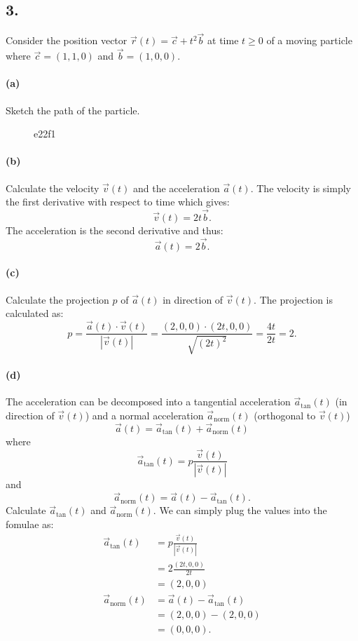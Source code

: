 \subsection*{3.} Consider the position vector $\Vec{r}(t) = \Vec{c} + t^2 \Vec{b}$ at time $t \geq 0$ of a moving particle where $\Vec{c} = \left( 1,1,0 \right) $ and $\Vec{b} = \left( 1,0,0 \right) $.

\paragraph{(a)} Sketch the path of the particle.
\bigbreak
\begin{figure}[ht]
    \centering
    \caption{e22f1}
    \label{fig:e22f1}
\end{figure}

\paragraph{(b)} Calculate the velocity $\Vec{v}(t)$ and the acceleration $\Vec{a} (t)$.
\bigbreak
The velocity is simply the first derivative with respect to time which gives:
\[ 
\Vec{v}(t) = 2t \Vec{b}
.\]
The acceleration is the second derivative and thus:
\[ 
\Vec{a}(t) = 2\Vec{b}
.\]


\paragraph{(c)} Calculate the projection $p$ of $\Vec{a}(t)$ in direction of $\Vec{v}(t)$.
\bigbreak
The projection is calculated as:
\[ 
p = \frac{\Vec{a}(t) \cdot \Vec{v}(t)}{\left| \Vec{v}(t) \right|} = \frac{\left( 2,0,0 \right) \cdot \left( 2t, 0, 0 \right) }{\sqrt{\left( 2t \right) ^2}} = \frac{4t}{2t} = 2
.\]


\paragraph{(d)} The acceleration can be decomposed into a tangential acceleration $\Vec{a}_{\mathrm{tan}}(t)$ (in direction of $\Vec{v}(t)$) and a normal acceleration $\Vec{a}_{\mathrm{norm}}(t) $ (orthogonal to $\Vec{v}(t)$)
\[ 
\Vec{a}(t) = \Vec{a}_{\mathrm{tan}} (t) + \Vec{a}_{\mathrm{norm}}(t)
\]
where
\[ 
\Vec{a}_{\mathrm{tan}} (t) = p \frac{\Vec{v}(t)}{\left| \Vec{v}(t) \right|}
\]
and
\[ 
\Vec{a}_{\mathrm{norm}}(t) = \Vec{a}(t) - \Vec{a}_{\mathrm{tan}}(t)
.\]
Calculate $\Vec{a}_{\mathrm{tan}}(t)$ and $\Vec{a}_{\mathrm{norm}}(t)$.
\bigbreak
We can simply plug the values into the fomulae as:
\begin{align*}
  \Vec{a}_{\mathrm{tan}} (t) &= p \frac{\Vec{v}(t)}{\left| \Vec{v}(t) \right|} \\
  &= 2 \frac{\left( 2t,0,0 \right) }{2t} \\
  &= \left( 2,0,0 \right)  \\
  \Vec{a}_{\mathrm{norm}}(t) &= \Vec{a}(t) - \Vec{a}_{\mathrm{tan}}(t) \\
  &= \left( 2,0,0 \right) - \left( 2,0,0 \right)  \\
  &= (0,0,0)
.\end{align*}


